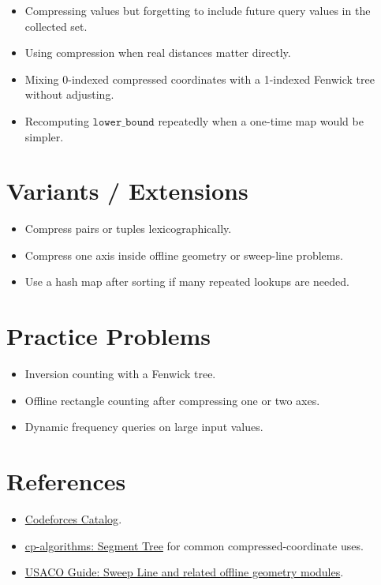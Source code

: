 \begin{itemize}
  \item Compressing values but forgetting to include future query values in the collected set.
  \item Using compression when real distances matter directly.
  \item Mixing 0-indexed compressed coordinates with a 1-indexed Fenwick tree without adjusting.
  \item Recomputing \(\texttt{lower\_bound}\) repeatedly when a one-time map would be simpler.
\end{itemize}

\section*{Variants / Extensions}

\begin{itemize}
  \item Compress pairs or tuples lexicographically.
  \item Compress one axis inside offline geometry or sweep-line problems.
  \item Use a hash map after sorting if many repeated lookups are needed.
\end{itemize}

\section*{Practice Problems}

\begin{itemize}
  \item Inversion counting with a Fenwick tree.
  \item Offline rectangle counting after compressing one or two axes.
  \item Dynamic frequency queries on large input values.
\end{itemize}

\section*{References}

\begin{itemize}
  \item \href{https://codeforces.com/catalog?locale=en}{Codeforces Catalog}.
  \item \href{https://cp-algorithms.com/data_structures/segment_tree.html}{cp-algorithms: Segment Tree} for common compressed-coordinate uses.
  \item \href{https://usaco.guide/plat/sweep-line}{USACO Guide: Sweep Line and related offline geometry modules}.
\end{itemize}
